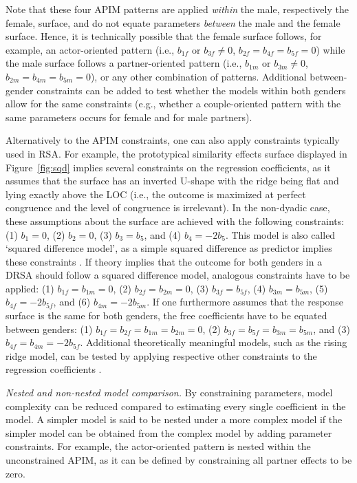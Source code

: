 \documentclass[jou,a4paper,draftfirst]{apa6}
\newcommand{\added}[1]{#1}
\begin{document}
\added{Note that these four APIM patterns are applied \emph{within} the male, respectively the female, surface, and do not equate parameters \emph{between} the male and the female surface. Hence, it is technically possible that the female surface follows, for example, an actor-oriented pattern (i.e., $b_{1f}$ or $b_{3f} \neq 0$, $b_{2f} = b_{4f} = b_{5f} = 0$) while the male surface follows a partner-oriented pattern (i.e., $b_{1m}$ or $b_{3m} \neq 0$, $b_{2m} = b_{4m} = b_{5m} = 0$), or any other combination of patterns. Additional between-gender constraints can be added to test whether the models within both genders allow for the same constraints (e.g., whether a couple-oriented pattern with the same parameters occurs for female and for male partners).}

Alternatively to the APIM constraints, one can also apply constraints typically used in RSA. For example, the prototypical similarity effects surface displayed in Figure~\ref{fig:sqd} implies several constraints on the regression coefficients, as it assumes that the surface has an inverted U-shape with the ridge being flat and lying exactly above the LOC (i.e., the outcome is maximized at perfect congruence and the level of congruence is irrelevant). In the non-dyadic case, these assumptions about the surface are achieved with the following constraints: (1) $b_1 = 0$, (2) $b_2 = 0$, (3) $b_3 = b_5$, and (4) $b_4 = -2 b_5$. This model is also called `squared difference model', as a simple squared difference as predictor implies these constraints \parencite{edwards_alternatives_2002,schonbrodt_testing_2016}. If theory implies that the outcome for both genders in a DRSA should follow a squared difference model, analogous constraints have to be applied: (1) $b_{1f} = b_{1m} = 0$, (2) $b_{2f} = b_{2m} = 0$, (3) $b_{3f} = b_{5f}$, (4) $b_{3m} = b_{5m}$, (5) $b_{4f} = -2 b_{5f}$, and (6) $b_{4m} = -2 b_{5m}$. If one furthermore assumes that the response surface is the same for both genders, the free coefficients have to be equated between genders: (1) $b_{1f} = b_{2f} = b_{1m} = b_{2m} = 0$, (2) $b_{3f} = b_{5f} = b_{3m} = b_{5m}$, and (3) $b_{4f} = b_{4m} = -2 b_{5f}$. Additional theoretically meaningful models, such as the rising ridge model, can be tested by applying respective other constraints to the regression coefficients \parencite{schonbrodt_testing_2016}.

\emph{Nested and non-nested model comparison.}
By constraining parameters, model complexity can be reduced compared to estimating every single coefficient in the model. A simpler model is said to be nested under a more complex model if the simpler model can be obtained from the complex model by adding parameter constraints. For example, the actor-oriented pattern is nested within the unconstrained APIM, as it can be defined by constraining all partner effects to be zero. 
\end{document}
